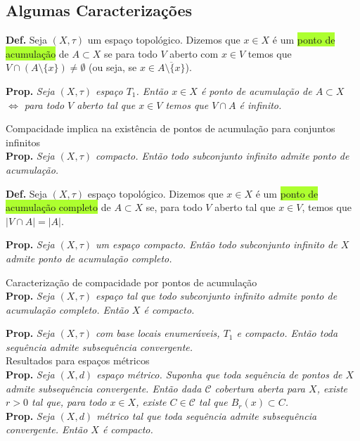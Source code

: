\documentclass{article}
\begin{document}
\begin{landscape}
\begin{multicols}{3}
\subsection{Algumas Caracterizações}
\textbf{Def.} Seja $(X, \tau)$ um espaço topológico. Dizemos que $x \in X$ é um \colorbox{GreenYellow}{ponto de acumulação} de $A \subset X$ se para todo $V$ aberto com $x\in V$ temos que $V \cap (A\setminus\{x\})\neq \emptyset$  (ou seja, se $x \in \overline{A \setminus \{x\}}$).\medskip

\textbf{Prop.} \textit{Seja $(X, \tau)$ espaço $T_1$. Então $x \in X$ é ponto de acumulação de $A \subset X$ $\Leftrightarrow$ para todo $V$ aberto tal que $x \in V$ temos que $V \cap A$ é infinito.}\medskip

\color{blue!70} Compacidade implica na existência de pontos de acumulação para conjuntos infinitos\\ \color{black}
\textbf{Prop.}\textit{ Seja $(X, \tau)$ compacto. Então todo subconjunto infinito admite ponto de acumulação.}\medskip

\textbf{Def.} Seja $(X, \tau)$ espaço topológico. Dizemos que $x \in X$ é um \colorbox{GreenYellow}{ponto de acumulação completo} de $A \subset X$ se, para todo $V$ aberto tal que $x \in V$, temos que $|V \cap A |= |A|$.\medskip

\textbf{Prop.} \textit{Seja $(X, \tau)$ um espaço compacto. Então todo subconjunto infinito de $X$ admite ponto de acumulação completo.}\medskip

\color{blue!70} Caracterização de compacidade por pontos de acumulação\\ \color{black}
\textbf{Prop.} \textit{Seja $(X, \tau)$ espaço tal que todo subconjunto infinito admite ponto de acumulação completo. Então $X$ é compacto.}\medskip

\textbf{Prop.} \textit{Seja $(X, \tau)$ com base locais enumeráveis, $T_1$ e compacto. Então toda sequência admite subsequência convergente.}\\

\colorbox{cinza}{Resultados para espaços métricos}\\
\textbf{Prop.} \textit{Seja $(X, d)$ espaço métrico. Suponha que toda sequência de pontos de $X$ admite subsequência convergente. Então dada $\mathcal{C}$ cobertura aberta para $X$, existe $r > 0$ tal que, para todo $x \in X$, existe $C \in \mathcal{C}$ tal que $B_r(x) \subset C$.}\\

\textbf{Prop.} \textit{Seja $(X,d)$ métrico tal que toda sequência admite subsequência convergente. Então $X$ é compacto.}\\


\end{multicols}
\end{landscape}
\end{document}
